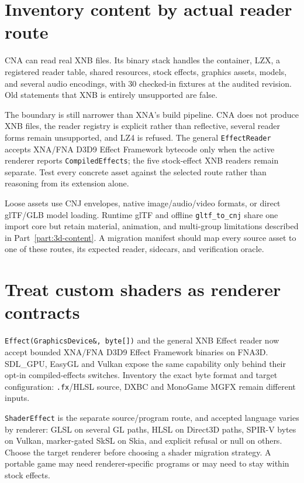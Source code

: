 \section{Inventory content by actual reader route}

CNA can read real XNB files.  Its binary stack handles the container, LZX, a registered reader
table, shared resources, stock effects, graphics assets, models, and several audio encodings, with
30 checked-in fixtures at the audited revision.  Old statements that XNB is entirely unsupported
are false.

The boundary is still narrower than XNA's build pipeline.  CNA does not produce XNB files, the
reader registry is explicit rather than reflective, several reader forms remain unsupported, and
LZ4 is refused. The general \texttt{EffectReader} accepts XNA/FNA D3D9 Effect Framework bytecode
only when the active renderer reports \texttt{CompiledEffects}; the five stock-effect XNB readers
remain separate. Test every concrete asset against the
selected route rather than reasoning from its extension alone.

Loose assets use CNJ envelopes, native image/audio/video formats, or direct glTF/GLB model loading.
Runtime glTF and offline \texttt{gltf\_to\_cnj} share one import core but retain material,
animation, and multi-group limitations described in Part~\ref{part:3d-content}.  A migration manifest should map
every source asset to one of these routes, its expected reader, sidecars, and verification oracle.

\section{Treat custom shaders as renderer contracts}

\texttt{Effect(GraphicsDevice\&, byte[])} and the general XNB Effect reader now accept bounded
XNA/FNA D3D9 Effect Framework binaries on FNA3D. SDL\_GPU, EasyGL and Vulkan expose the same
capability only behind their opt-in compiled-effects switches. Inventory the exact byte format and
target configuration: \texttt{.fx}/HLSL source, DXBC and MonoGame MGFX remain different inputs.

\texttt{ShaderEffect} is the separate source/program route, and accepted language varies by
renderer: GLSL on several GL paths, HLSL on Direct3D paths, SPIR-V bytes on Vulkan, marker-gated
SkSL on Skia, and explicit refusal or null on others.  Choose the target renderer before choosing
a shader migration strategy.  A portable game may need renderer-specific programs or may need to
stay within stock effects.

